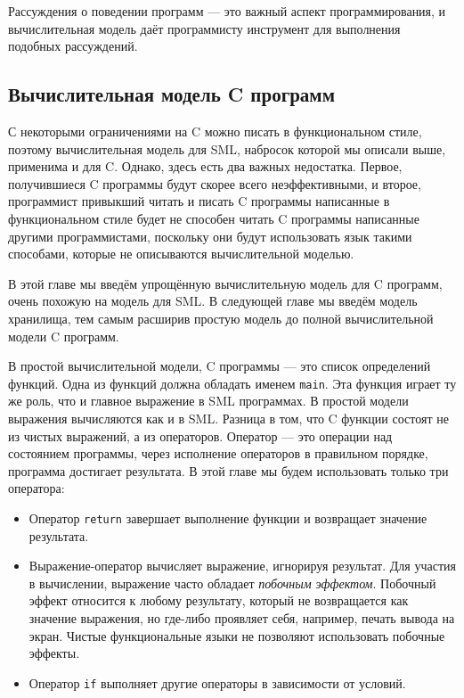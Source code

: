 Рассуждения о поведении программ --- это важный аспект программирования, и вычислительная модель даёт программисту инструмент для выполнения подобных рассуждений.

\subsection{Вычислительная модель C программ}\label{ComputationalModelForCPrograms}

С некоторыми ограничениями на C можно писать в функциональном стиле, поэтому вычислительная модель для SML, набросок которой мы описали выше, применима и для C. Однако, здесь есть два важных недостатка. Первое, получившиеся C программы будут скорее всего неэффективными, и второе, программист привыкший читать и писать C программы написанные в функциональном стиле будет не способен читать C программы написанные другими программистами, поскольку они будут использовать язык такими способами, которые не описываются вычислительной моделью.

В этой главе мы введём упрощённую вычислительную модель для C программ, очень похожую на модель для SML. В следующей главе мы введём модель хранилища, тем самым расширив простую модель до полной вычислительной модели C программ.

В простой вычислительной модели, C программы --- это список определений функций. Одна из функций должна обладать именем \lstinline|main|. Эта функция играет ту же роль, что и главное выражение в SML программах. В простой модели выражения вычисляются как и в SML. Разница в том, что C функции состоят не из чистых выражений, а из операторов. Оператор --- это операции над состоянием программы, через исполнение операторов в правильном порядке, программа достигает результата. В этой главе мы будем использовать только три оператора:

\begin{itemize}
\item{Оператор \lstinline|return| завершает выполнение функции и возвращает значение результата.}

\item{Выражение-оператор вычисляет выражение, игнорируя результат. Для участия в вычислении, выражение часто обладает \emph{побочным эффектом}. Побочный эффект относится к любому результату, который не возвращается как значение выражения, но где-либо проявляет себя, например, печать вывода на экран. Чистые функциональные языки не позволяют использовать побочные эффекты.}

\item{Оператор \lstinline|if| выполняет другие операторы в зависимости от условий.}
\end{itemize}

